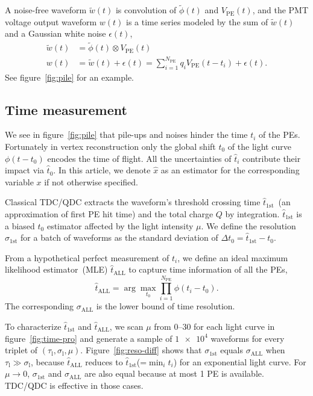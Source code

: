 A noise-free waveform $\tilde{w}(t)$ is convolution of $\tilde{\phi}(t)$ and $V_\mathrm{PE}(t)$, and the PMT voltage output waveform $w(t)$ is a time series modeled by the sum of $\tilde{w}(t)$ and a Gaussian white noise $\epsilon(t)$,
\begin{equation}
  \label{eq:1}
  \begin{aligned}
    \tilde{w}(t) &= \tilde{\phi}(t) \otimes V_\mathrm{PE}(t) \\
    w(t) &= \tilde{w}(t) + \epsilon(t) = \sum_{i=1}^{N_\mathrm{PE}} q_i V_\mathrm{PE}(t-t_i) + \epsilon(t).
  \end{aligned}
\end{equation}
See figure~\ref{fig:pile} for an example.


\subsection{Time measurement}
\label{sec:time}
We see in figure~\ref{fig:pile} that pile-ups and noises hinder the time $t_i$ of the PEs. Fortunately in vertex reconstruction only the global shift $t_0$ of the light curve $\phi(t-t_0)$ encodes the time of flight.  All the uncertainties of $\hat{t}_i$ contribute their impact via $\hat{t}_0$. In this article, we denote $\hat{x}$ as an estimator for the corresponding variable $x$ if not otherwise specified.

Classical TDC/QDC extracts the waveform's threshold crossing time $\hat{t}_\mathrm{1st}$~(an approximation of first PE hit time) and the total charge $Q$ by integration.  $\hat{t}_\mathrm{1st}$ is a biased $t_0$ estimator affected by the light intensity $\mu$. We define the resolution $\sigma_\mathrm{1st}$ for a batch of waveforms as the standard deviation of $\Delta t_0 = \hat{t}_\mathrm{1st} - t_0$.

From a hypothetical perfect measurement of $t_i$, we define an ideal maximum likelihood estimator~(MLE) $\hat{t}_\mathrm{ALL}$ to capture time information of all the PEs,
\begin{equation}
  \label{eq:2}
  \hat{t}_\mathrm{ALL} = \arg\underset{t_0}{\max} \prod_{i=1}^{N_\mathrm{PE}} \phi(t_i-t_0).
\end{equation}
The corresponding $\sigma_\mathrm{ALL}$ is the lower bound of time resolution. 

To characterize $\hat{t}_\mathrm{1st}$ and $\hat{t}_\mathrm{ALL}$, we scan $\mu$ from \numrange{0}{30} for each light curve in figure~\ref{fig:time-pro} and generate a sample of $\num[retain-unity-mantissa=false]{1e4}$ waveforms for every triplet of $(\tau_\mathrm{l}, \sigma_\mathrm{l}, \mu)$.  Figure~\ref{fig:reso-diff} shows that $\sigma_{\mathrm{1st}}$ equals $\sigma_{\mathrm{ALL}}$ when $\tau_\mathrm{l} \gg \sigma_\mathrm{l}$, because $\hat{t}_\mathrm{ALL}$ reduces to $\hat{t}_\mathrm{1st}$(=$\min_i t_i$) for an exponential light curve. For $\mu \to 0$, $\sigma_{\mathrm{1st}}$ and $\sigma_{\mathrm{ALL}}$ are also equal because at most 1 PE is available.  TDC/QDC is effective in those cases.

